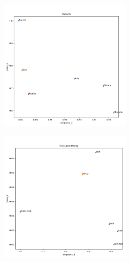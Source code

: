 \documentclass{article}
\newcommand{\mediumimagewidth}{250}
\begin{document}
\begin{titlepage}
\begin{figure}[H]
\centering
\includegraphics[width=\mediumimagewidth]{images/Friends_heuristics.png}
\end{figure}

\begin{figure}[H]
\centering
\includegraphics[width=\mediumimagewidth]{images/Rick and Morty_heuristics.png}
\end{figure}



\end{titlepage}
\end{document}
